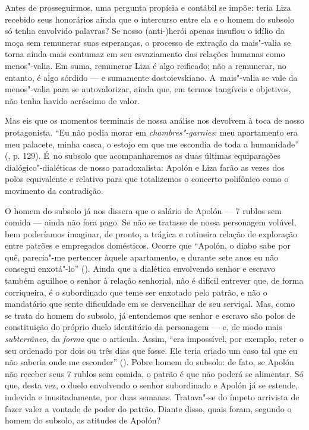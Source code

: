 Antes de prosseguirmos, uma pergunta propícia e contábil se impõe: teria
Liza recebido seus honorários ainda que o intercurso entre ela e o homem
do subsolo só tenha envolvido palavras? Se nosso \mbox{(anti-)herói} apenas
insuflou o idílio da moça sem remunerar suas esperanças, o processo de
extração da mais"-valia se torna ainda mais contumaz em seu esvaziamento
das relações humanas como menos"-valia. Em suma, remunerar Liza é algo
reificado; não a remunerar, no entanto, é algo sórdido --- e sumamente
dostoievskiano. A~mais"-valia se vale da menos"-valia para se
autovalorizar, ainda que, em termos tangíveis e objetivos, não tenha
havido acréscimo de valor.

Mas eis que os momentos terminais de nossa análise nos devolvem à toca
de nosso protagonista. ``Eu não podia morar em \emph{chambres"-garnies}:
meu apartamento era meu palacete, minha casca, o estojo em que me
escondia de toda a humanidade'' (, p. 129). É~no subsolo que
acompanharemos as duas últimas equiparações dialógico"-dialéticas de
nosso paradoxalista: Apolón e Liza farão as vezes dos polos equivalente
e relativo para que totalizemos o concerto polifônico como o movimento
da contradição.

O homem do subsolo já nos dissera que o salário de Apolón --- 7 rublos
sem comida --- ainda não fora pago. Se não se tratasse de nossa
personagem volúvel, bem poderíamos imaginar, de pronto, a trágica e
rotineira relação de exploração entre patrões e empregados domésticos.
Ocorre que ``Apolón, o diabo sabe por quê, parecia"-me pertencer àquele
apartamento, e durante sete anos eu não consegui enxotá"-lo'' ().
Ainda que a dialética envolvendo senhor e escravo também aguilhoe o
senhor à relação senhorial, não é difícil entrever que, de forma
corriqueira, é o subordinado que teme ser enxotado pelo patrão, e não o
mandatário que sente dificuldade em se desvencilhar de seu serviçal.
Mas, como se trata do homem do subsolo, já entendemos que senhor e
escravo são polos de constituição do próprio duelo identitário da
personagem --- e, de modo mais \emph{subterrâneo}, da \emph{forma} que o
articula. Assim, ``era impossível, por exemplo, reter o seu ordenado por
dois ou três dias que fosse. Ele teria criado um caso tal que eu não
saberia onde me esconder'' (). Pobre homem do subsolo: de fato, se
Apolón não receber seus 7 rublos sem comida, o patrão é que não poderá
se alimentar. Só que, desta vez, o duelo envolvendo o senhor subordinado
e Apolón já se estende, indevida e inusitadamente, por duas semanas.
Tratava"-se do ímpeto arrivista de fazer valer a vontade de poder do
patrão. Diante disso, quais foram, segundo o homem do subsolo, as
atitudes de Apolón?

